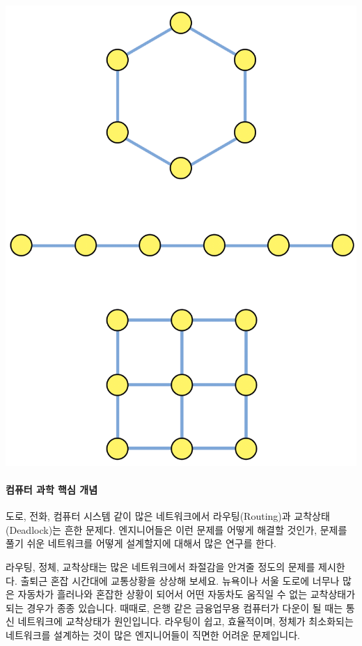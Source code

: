 \documentclass[]{article}
\begin{document}
\includegraphics{csunplugged/02-part/img/ch10-network/10-network-02-activity.png}

\mbox{}\paragraph{컴퓨터 과학 핵심 개념}\label{section-142}

도로, 전화, 컴퓨터 시스템 같이 많은 네트워크에서 라우팅(Routing)과
교착상태(Deadlock)는 흔한 문제다. 엔지니어들은 이런 문제를 어떻게 해결할
것인가, 문제를 풀기 쉬운 네트워크를 어떻게 설계할지에 대해서 많은 연구를
한다.

라우팅, 정체, 교착상태는 많은 네트워크에서 좌절감을 안겨줄 정도의 문제를
제시한다. 출퇴근 혼잡 시간대에 교통상황을 상상해 보세요. 뉴욕이나 서울
도로에 너무나 많은 자동차가 흘러나와 혼잡한 상황이 되어서 어떤 자동차도
움직일 수 없는 교착상태가 되는 경우가 종종 있습니다. 때때로, 은행 같은
금융업무용 컴퓨터가 다운이 될 때는 통신 네트워크에 교착상태가
원인입니다. 라우팅이 쉽고, 효율적이며, 정체가 최소화되는 네트워크를
설계하는 것이 많은 엔지니어들이 직면한 어려운 문제입니다.
\end{document}
